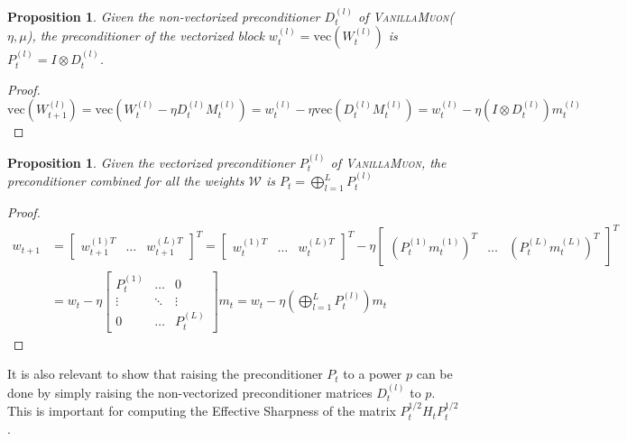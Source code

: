 \documentclass{article}
\theoremstyle{plain}
\newtheorem{proposition}[theorem]{Proposition}
\theoremstyle{definition}
\theoremstyle{remark}
\begin{document}
\begin{proposition}
Given the non-vectorized preconditioner $D_{t}^{(l)}$ of \textsc{VanillaMuon}($\eta, \mu$), the preconditioner of the vectorized block $w_t^{(l)} = \text{vec}(W_t^{(l)})$ is $P_{t}^{(l)} = I \otimes D_{t}^{(l)}$.
\end{proposition}

\begin{proof}
\begin{equation}
\text{vec}(W^{(l)}_{t+1}) = \text{vec}(W^{(l)}_t - \eta D_{t}^{(l)}M_{t}^{(l)}) = w_t^{(l)} - \eta \text{vec}(D_{t}^{(l)}M_{t}^{(l)}) = w_t^{(l)} - \eta(I \otimes D_{t}^{(l)})m_{t}^{(l)}
\end{equation}
\end{proof}

\begin{proposition}
Given the vectorized preconditioner $P_{t}^{(l)}$ of \textsc{VanillaMuon}, the preconditioner combined for all the weights $\mathcal{W}$ is $P_{t} = \bigoplus_{l=1}^L P_{t}^{(l)}$
\end{proposition}

\begin{proof}
\begin{equation}
\begin{aligned}
    w_{t+1} &= \begin{bmatrix}
    w_{t+1}^{(1)T} & \dots & w_{t+1}^{(L)T} 
    \end{bmatrix}^T = \begin{bmatrix}
    w_{t}^{(1)T} & \dots & w_{t}^{(L)T} 
    \end{bmatrix}^T - \eta \begin{bmatrix}
    (P_{t}^{(1)}m_{t}^{(1)})^T & \dots & (P_{t}^{(L)}m_{t}^{(L)})^T 
    \end{bmatrix}^T \\
    &= w_t - \eta\begin{bmatrix}
    P_{t}^{(1)} & \dots & 0 \\
    \vdots & \ddots & \vdots \\
    0 & \dots & P_{t}^{(L)}
    \end{bmatrix} m_{t} = w_t - \eta \left(\bigoplus_{l=1}^L P_{t}^{(l)}\right)m_{t}
\end{aligned}
\end{equation}
\end{proof}

It is also relevant to show that raising the preconditioner $P_{t}$ to a power $p$ can be done by simply raising the non-vectorized preconditioner matrices $D_{t}^{(l)}$ to $p$. This is important for computing the Effective Sharpness of the matrix $P_{t}^{1/2}H_{t}P_{t}^{1/2}$.
\end{document}
